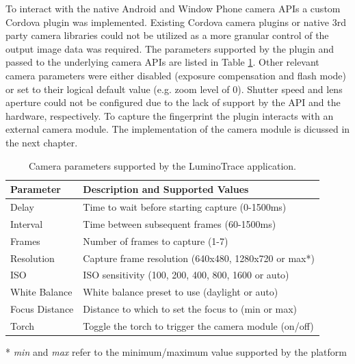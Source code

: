 \documentclass[thesis.tex]{subfiles}
\begin{document}
To interact with the native Android and Window Phone camera APIs a custom Cordova plugin was implemented. Existing Cordova camera plugins or native 3rd party camera libraries could not be utilized as a more granular control of the output image data was required. The parameters supported by the plugin and passed to the underlying camera APIs are listed in Table \ref{table:camera-parameters}. Other relevant camera parameters were either disabled (exposure compensation and flash mode) or set to their logical default value (e.g. zoom level of 0). Shutter speed and lens aperture could not be configured due to the lack of support by the API and the hardware, respectively. To capture the fingerprint the plugin interacts with an external camera module. The implementation of the camera module is dicussed in the next chapter.

\begin{table}[ht]
	\caption{Camera parameters supported by the LuminoTrace application.} \label{table:camera-parameters}

	\begin{center}
	\begin{tabular}{| m{2.75cm} | m{9.75cm} |}

		\hline
		\textbf{Parameter}	& \textbf{Description and Supported Values} \\ \hline
		Delay				& Time to wait before starting capture (0-1500ms) \\
		\hline
		Interval 			& Time between subsequent frames (60-1500ms) \\
		\hline
		Frames 				& Number of frames to capture (1-7) \\
		\hline
		Resolution 			& Capture frame resolution (640x480, 1280x720 or max\footnotesize{*}) \\
		\hline
		ISO 				& ISO sensitivity (100, 200, 400, 800, 1600 or auto) \\
		\hline
		White Balance		& White balance preset to use (daylight or auto) \\
		\hline
		Focus Distance		& Distance to which to set the focus to (min or max) \\
		\hline
		Torch 				& Toggle the torch to trigger the camera module (on/off) \\
		\hline
	\end{tabular}
	\end{center}
	\scriptsize{*} \small{\emph{min} and \emph{max} refer to the minimum/maximum value supported by the platform}
\end{table}
\end{document}
